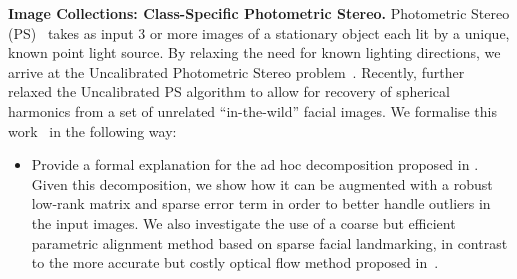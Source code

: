 \textbf{Image Collections: Class-Specific Photometric Stereo.} Photometric
Stereo (PS)~\cite{woodham1980photometric} takes as input 3 or more images of
a stationary object each lit by a unique, known point light source. 
By relaxing the need for known lighting directions, we arrive at the
Uncalibrated Photometric Stereo problem~\cite{hayakawa1994photometric,fan1997surface,yuille1999determining,basri2007photometric}.
Recently, \citet{KemelmacherShlizerman:2013iv} further relaxed the 
Uncalibrated PS algorithm to allow for recovery of spherical harmonics 
from a set of unrelated ``in-the-wild'' facial images. We formalise this
work~\cite{KemelmacherShlizerman:2013iv} in the following way:
\begin{itemize}
	\item Provide a formal explanation for the ad hoc decomposition proposed
	      in \citet{KemelmacherShlizerman:2013iv}. Given this decomposition,
	      we show how it can be augmented with a robust low-rank matrix and 
	      sparse error term in order to better handle outliers in the input
	      images. We also investigate the use of a coarse but efficient
	      parametric alignment method based on sparse facial landmarking, 
	      in contrast to the more accurate but costly optical flow method 
	      proposed in~\cite{KemelmacherShlizerman:2013iv}.
\end{itemize}

